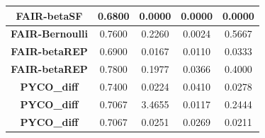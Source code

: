 \documentclass[preprint,12pt]{elsarticle}
\begin{document}
\begin{table}
\begin{tabular}{|c|c|c|c|c|}
		\textbf{FAIR-betaSF}    & 0.6800       & 0.0000       & 0.0000       & 0.0000        \\ \hline
		\textbf{FAIR-Bernoulli} & 0.7600       & 0.2260       & 0.0024       & 0.5667        \\ \hline
		\textbf{FAIR-betaREP}   & 0.6900       & 0.0167       & 0.0110       & 0.0333        \\ \hline
		\textbf{FAIR-betaREP}   & 0.7800       & 0.1977       & 0.0366       & 0.4000        \\ \hline
		\textbf{PYCO\_diff}     & 0.7400       & 0.0224       & 0.0410       & 0.0278        \\ \hline
		\textbf{PYCO\_diff}     & 0.7067       & 3.4655       & 0.0117       & 0.2444        \\ \hline
		\textbf{PYCO\_diff}     & 0.7067       & 0.0251       & 0.0269       & 0.0211        \\ \hline
	\end{tabular}
	\label{tab:Ger-age}
\end{table}
\end{document}
